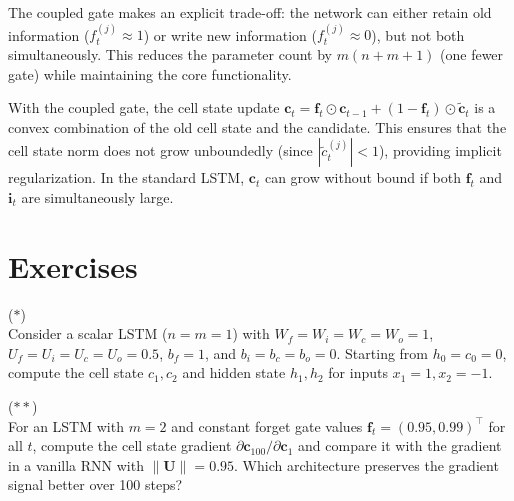 \documentclass[11pt,a4paper]{article}
\begin{document}
\begin{remark}
The coupled gate makes an explicit trade-off: the network can either
retain old information ($f_t^{(j)} \approx 1$) or write new
information ($f_t^{(j)} \approx 0$), but not both simultaneously.
This reduces the parameter count by $m(n + m + 1)$ (one fewer gate)
while maintaining the core functionality.
\end{remark}

\begin{example}
\label{ex:coupled}
With the coupled gate, the cell state update
$\mathbf{c}_t = \mathbf{f}_t \odot \mathbf{c}_{t-1} +
(1 - \mathbf{f}_t) \odot \tilde{\mathbf{c}}_t$ is a convex
combination of the old cell state and the candidate.  This ensures
that the cell state norm does not grow unboundedly (since
$|\tilde{c}_t^{(j)}| < 1$), providing implicit regularization.
In the standard LSTM, $\mathbf{c}_t$ can grow without bound if
both $\mathbf{f}_t$ and $\mathbf{i}_t$ are simultaneously large.
\end{example}

\section{Exercises}
\label{sec:exercises}

\begin{exercise}
\textnormal{(\(\ast\))} \\
Consider a scalar LSTM ($n = m = 1$) with
$W_f = W_i = W_c = W_o = 1$, $U_f = U_i = U_c = U_o = 0.5$,
$b_f = 1$, and $b_i = b_c = b_o = 0$.  Starting from
$h_0 = c_0 = 0$, compute the cell state $c_1, c_2$ and hidden state
$h_1, h_2$ for inputs $x_1 = 1, x_2 = -1$.
\end{exercise}

\begin{exercise}
\textnormal{(\(\ast\ast\))} \\
For an LSTM with $m = 2$ and constant forget gate values
$\mathbf{f}_t = (0.95, 0.99)^\top$ for all $t$, compute the cell
state gradient $\partial \mathbf{c}_{100} / \partial \mathbf{c}_1$
and compare it with the gradient in a vanilla RNN with
$\|\mathbf{U}\| = 0.95$.  Which architecture preserves the gradient
signal better over 100 steps?
\end{exercise}
\end{document}
